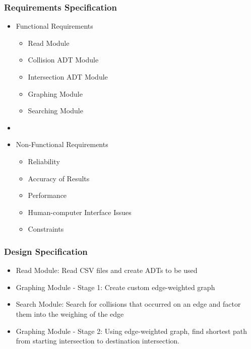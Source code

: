 \documentclass[t,12pt,numbers,fleqn]{beamer}
\begin{document}
\begin{frame}
\frametitle{Requirements Specification}
\begin{itemize}
    \item Functional Requirements
    \begin{itemize}
        \item Read Module
        \item Collision ADT Module
        \item Intersection ADT Module
        \item Graphing Module
        \item Searching Module
    \end{itemize}
    \item[] %
    \item Non-Functional Requirements
    \begin{itemize}
        \item Reliability
        \item Accuracy of Results
        \item Performance
        
        


        \item Human-computer Interface Issues
        \item Constraints
    \end{itemize}
\end{itemize}
\end{frame}
\begin{frame}
\frametitle{Design Specification}
\begin{itemize}
    \item Read Module: Read CSV files and create ADTs to be used
    \item Graphing Module - Stage 1: Create custom edge-weighted graph
    \item Search Module: Search for collisions that occurred on an edge and factor them into the weighing of the edge
    \item Graphing Module - Stage 2: Using edge-weighted graph, find shortest path from starting intersection to destination intersection.
\end{itemize}
\end{frame}
\end{document}
